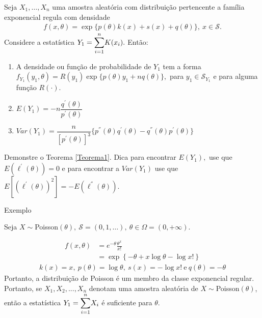 \documentclass[12pt]{beamer}
\begin{document}
\begin{frame}{}
\begin{Teorema}\label{Teorema1}
\justifying
Seja $X_{1},\ldots,X_{n}$ uma amostra aleatória com distribuição pertencente a família exponencial regula com densidade
\begin{align*}
    f(x,\theta)=\exp{\{p(\theta)k(x)+s(x)+q(\theta)\}},~x\in \mathcal{S}.
\end{align*}
Considere a estatística $Y_{1}={\displaystyle \sum_{i=1}^{n}} K(x_i).$ Então:
\begin{enumerate}
    \item A densidade ou função de probabilidade de $Y_{1}$ tem a forma $f_{Y_{1}}(y_{1},\theta)=R(y_{1})\exp{\{p(\theta)y_{1}+nq(\theta)\}},$ para $y_{1}\in\mathcal{S}_{Y_{1}}$ e para alguma função $R(\cdot).$
    \item $E(Y_{1})=-n\dfrac{q^{'}(\theta)}{p^{'}(\theta)}$
    \item $Var(Y_{1})=\dfrac{n}{[p^{'}(\theta)]^{3}}\{p^{''}(\theta)q^{'}(\theta)-q^{''}(\theta)p^{'}(\theta)\}$
\end{enumerate}
\end{Teorema}
\end{frame}

\begin{frame}{}
\begin{block}{\Home}
\justifying
Demonstre o Teorema \ref{Teorema1}. Dica para encontrar $E(Y_{1}),$ use que $E(\ell^{'}(\theta))=0$ e para encontrar a $Var(Y_{1})$ use que $E[(\ell^{'}(\theta))^{2}]=-E(\ell^{''}(\theta)).$
\end{block}
\end{frame}

\begin{frame}{Exemplo}
\begin{block}{}
\justifying
Seja $X\sim$Poisson$(\theta),~\mathcal{S}=(0,1,\ldots),~\theta\in \Omega=(0,+\infty).$ 

\begin{align*}
f(x, \theta) &= e^{-\theta} \frac{\theta^x}{x!}\\ 
&= \exp\left\{-\theta + x\log{\theta} - \log{x!} \right\}
\end{align*}
\begin{align*}
k(x)=x,~p(\theta)=\log{\theta},~s(x)= -\log{x!}~\text{e}~q(\theta)=-\theta
\end{align*}
Portanto, a distribuição de Poisson é um membro da classe exponencial regular. Portanto, se $X_1, X_2, ..., X_n$ denotam uma amostra aleatória de $X\sim$Poisson$(\theta)$, então a estatística $Y_1 = {\displaystyle \sum_{i=1}^{n}} X_i$ é suficiente para $\theta$. 
\end{block}
\end{frame}
\end{document}
